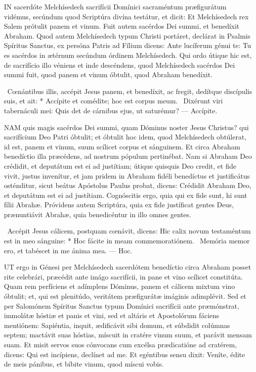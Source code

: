 \lettrine[lines=2]{I}{N} sacerdóte Melchísedech sacrifícii Domínici sacraméntum præfigurátum vidémus, secúndum quod Scriptúra divína testátur, et dicit: Et Melchísedech rex Salem prótulit panem et vinum. Fuit autem sacérdos Dei summi, et benedíxit Abraham. Quod autem Melchísedech typum Christi portáret, declárat in Psalmis Spíritus Sanctus, ex persóna Patris ad Fílium dicens: Ante lucíferum génui te: Tu es sacérdos in ætérnum secúndum órdinem Melchísedech. Qui ordo útique hic est, de sacrifício illo véniens et inde descéndens, quod Melchísedech sacérdos Dei summi fuit, quod panem et vinum óbtulit, quod Abraham benedíxit.

\R\ Cœnántibus illis, accépit Jesus panem, et benedíxit, ac fregit, dedítque discípulis suis, et ait: * Accípite et comédite; hoc est corpus meum. \V\ Dixérunt viri tabernáculi mei: Quis det de cárnibus ejus, ut saturémur? --- Accípite.


\lettrine[lines=2]{N}{AM} quis magis sacérdos Dei summi, quam Dóminus noster Jesus Christus? qui sacrifícium Deo Patri óbtulit; et óbtulit hoc idem, quod Melchísedech obtúlerat, id est, panem et vinum, suum scílicet corpus et sánguinem. Et circa Abraham benedíctio illa præcédens, ad nostrum pópulum pertinébat. Nam si Abraham Deo crédidit, et deputátum est ei ad justítiam; útique quisquis Deo credit, et fide vivit, justus invenítur, et jam pridem in Abraham fidéli benedíctus et justificátus osténditur, sicut beátus Apóstolus Paulus probat, dicens: Crédidit Abraham Deo, et deputátum est ei ad justítiam. Cognóscitis ergo, quia qui ex fide sunt, hi sunt fílii Abrahæ. Próvidens autem Scriptúra, quia ex fide justíficat gentes Deus, prænuntiávit Abrahæ, quia benedicéntur in illo omnes gentes.

\R\ Accépit Jesus cálicem, postquam cœnávit, dicens: Hic calix novum testaméntum est in meo sánguine: * Hoc fácite in meam commemoratiónem. \V\ Memória memor ero, et tabéscet in me ánima mea. --- Hoc.


\lettrine[lines=2]{U}{T} ergo in Génesi per Melchísedech sacerdótem benedíctio circa Abraham posset rite celebrári, præcédit ante imágo sacrifícii, in pane et vino scílicet constitúta. Quam rem perfíciens et adímplens Dóminus, panem et cálicem mixtum vino óbtulit; et, qui est plenitúdo, veritátem præfigurátæ imáginis adimplévit. Sed et per Salomónem Spíritus Sanctus typum Domínici sacrifícii ante præmónstrat, immolátæ hóstiæ et panis et vini, sed et altáris et Apostolórum fáciens mentiónem: Sapiéntia, inquit, ædificávit sibi domum, et súbdidit colúmnas septem; mactávit suas hóstias, míscuit in cratére vinum suum, et parávit mensam suam. Et misit servos suos cónvocans cum excélsa prædicatióne ad cratérem, dicens: Qui est incípiens, declínet ad me. Et egéntibus sensu dixit: Veníte, édite de meis pánibus, et bíbite vinum, quod míscui vobis.

